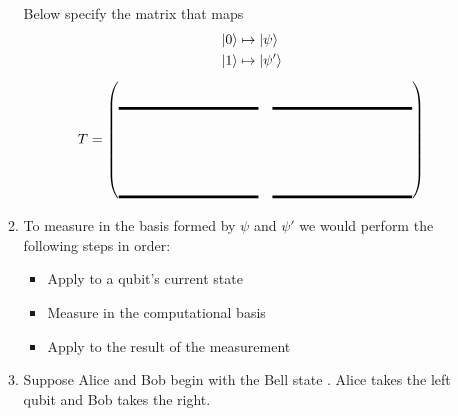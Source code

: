 \documentclass[12pt]{article}
\begin{document}
\begin{enumerate}
\begin{enumerate}[label=\theenumi.\arabic*]
Below specify the matrix that maps
\begin{align*}
    \ket{0} &\mapsto \ket{\psi} \\
    \ket{1} &\mapsto \ket{\psi'}
\end{align*}
\[
T = \begin{pmatrix*}[r]
\Blank[10em]{} & \Blank[10em]{} \\[4em]
\Blank[10em]{} & \Blank[10em]{}
\end{pmatrix*}
\]
\item To measure in the basis formed by $\psi$ and $\psi'$ we would perform the following steps in order:
\begin{itemize}
    \item Apply \Blank{} to a qubit's current state
    \item Measure in the computational basis
    \item Apply \Blank{} to the result of the measurement
\end{itemize}
\item Suppose Alice and Bob begin with the Bell state . Alice takes the left qubit and Bob takes the right.
\end{enumerate}
\end{enumerate}
\end{document}

